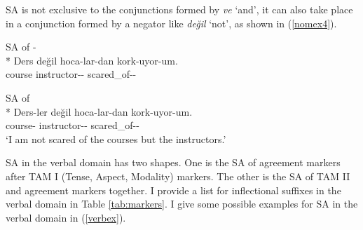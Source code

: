 SA is not exclusive to the conjunctions formed by \textit{ve} `and', it can also take place in a conjunction formed by a negator like \textit{değil} `not', as shown in (\ref{nomex4}).

\begin{exe}
    \ex \label{nomex4}
    \begin{xlist}
        \ex SA of {\Pl-\Abl}\\*
        \gll Ders değil hoca-lar-dan kork-uyor-um. \\ 
        course {\Neg} instructor-{\Pl}-{\Abl} scared\_of-{\Prog}-{\Fsg} \\
        \glt ${}$

        \ex SA of {\Abl}\\*
        \gll Ders-ler değil hoca-lar-dan kork-uyor-um. \\ 
        course-{\Pl} {\Neg} instructor-{\Pl}-{\Abl} scared\_of-{\Prog}-{\Fsg} \\
        \glt `I am not scared of the courses but the instructors.'
    \end{xlist}
\end{exe}

SA in the verbal domain has two shapes. One is the SA of agreement markers after TAM I (Tense, Aspect, Modality) markers. The other is the SA of TAM II and agreement markers together. I provide a list for inflectional suffixes in the verbal domain in Table \ref{tab:markers}. I give some possible examples for SA in the verbal domain in (\ref{verbex}).

